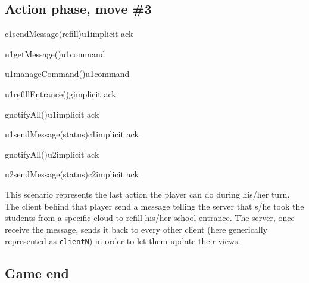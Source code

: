 \documentclass[a4paper]{article}
\begin{document}
	\pagebreak

	\subsection{Action phase, move \#3}

	\begin{center}
		\begin{sequencediagram}

			\begin{call}{c1}{sendMessage(refill)}{u1}{implicit ack}
				\begin{call}{u1}{getMessage()}{u1}{command}
				\end{call}
				\begin{call}{u1}{manageCommand()}{u1}{command}
				\end{call}
				\begin{call}{u1}{refillEntrance()}{g}{implicit ack}
					\begin{call}{g}{notifyAll()}{u1}{implicit ack}
						\begin{call}{u1}{sendMessage(status)}{c1}{implicit ack}
						\end{call}
					\end{call}
					\begin{call}{g}{notifyAll()}{u2}{implicit ack}
						\begin{call}{u2}{sendMessage(status)}{c2}{implicit ack}
						\end{call}
					\end{call}
				\end{call}
			\end{call}
		\end{sequencediagram}
	\end{center}

	This scenario represents the last action the player can do during his/her turn. The client behind that player send a message telling the server that s/he took the students from a specific cloud to refill his/her school entrance. The server, once receive the message, sends it back to every other client (here generically represented as \verb|clientN|) in order to let them update their views.

	\subsection{Game end}
\end{document}
